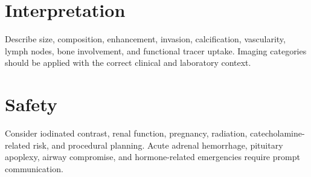 \section{Interpretation}
Describe size, composition, enhancement, invasion, calcification, vascularity, lymph nodes, bone involvement, and functional tracer uptake. Imaging categories should be applied with the correct clinical and laboratory context.

\section{Safety}
Consider iodinated contrast, renal function, pregnancy, radiation, catecholamine-related risk, and procedural planning. Acute adrenal hemorrhage, pituitary apoplexy, airway compromise, and hormone-related emergencies require prompt communication.

\clearpage

